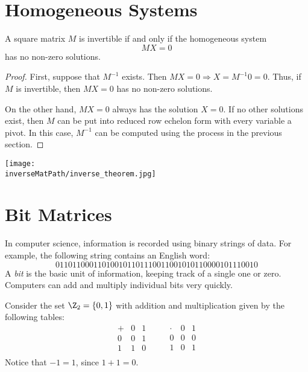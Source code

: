 
\section{Homogeneous Systems}

\begin{theorem}
A square matrix $M$ is invertible if and only if the homogeneous system \[MX=0\] has no non-zero solutions.
\end{theorem}

\begin{proof}
First, suppose that $M^{-1}$ exists.  Then $MX=0 \Rightarrow X=M^{-1}0=0$.  Thus, if $M$ is invertible, then $MX=0$ has no non-zero solutions.

On the other hand, $MX=0$ always has the solution $X=0$.  If no other solutions exist, then $M$ can be put into reduced row echelon form with every variable a pivot.  In this case, $M^{-1}$ can be computed using the process in the previous section.
\end{proof}

\begin{center}
\texttt{[image: \\inverseMatPath/inverse\_theorem.jpg]}
\end{center}


\section{Bit Matrices}
In computer science, information is recorded using binary strings of data.  For example, the following string contains an English word:
\[
011011000110100101101110011001010110000101110010
\]
A \hypertarget{bits}{\emph{bit}} is the basic unit of information, keeping track of a single one or zero.  Computers can add and multiply individual bits very quickly.

Consider the set $\Z_2=\{0,1 \}$ with addition and multiplication given by the following tables:
\label{Z2}
\[
\begin{array}{c|cc}
+ & 0 & 1 \\ \hline
0 & 0 & 1 \\
1 & 1 & 0 \\
\end{array}
\qquad
\begin{array}{c|cc}
\cdot & 0 & 1 \\ \hline
0 & 0 & 0 \\
1 & 0 & 1 \\
\end{array}
\]
Notice that $-1=1$, since $1+1=0$.

